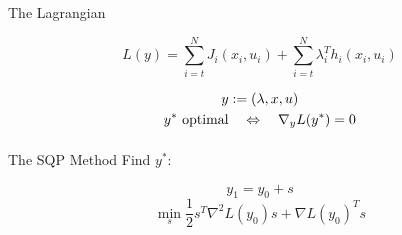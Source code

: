 

\begin{frame}{The Lagrangian}
\begin{block}{ }
\[  L(y) =   \sum\limits_{i=t}^{N} J_{i}(x_{i},u_{i})
  + \sum\limits_{i=t}^{N} \lambda_{i}^{T} h_i (x_i ,u_i ) \]
\end{block}
\begin{gather*}
	y := (\lambda,x,u) \\
	\vspace{1ex}
	y^* \text{ optimal} \quad \Leftrightarrow \quad \nabla_{y} L(y^*)  = 0
\end{gather*}

\end{frame}

%	
%	
%		
%		
%	

\begin{frame}{The SQP Method}
Find $y^*$:
\begin{block}{ }
\[ y_{1} = y_{0} + s \]
\[\min_{s}  \frac{1}{2} s^T \nabla^2 L(y_0) s + \nabla L(y_0)^T s \]
\end{block}
\centering


\end{frame}

